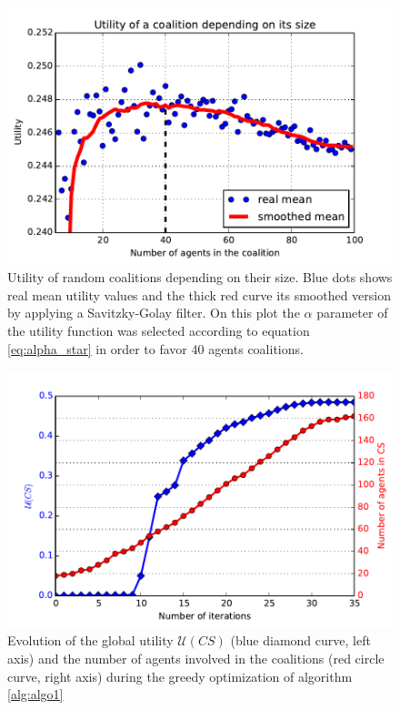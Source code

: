 \documentclass[conference]{IEEEtran}
\begin{document}
\begin{figure}
\includegraphics[scale=.6]{real_utility_2.pdf}
\caption{Utility of random coalitions depending on their size. Blue dots shows real mean utility values and the thick red curve its smoothed version by applying a Savitzky-Golay filter. On this plot the $ \alpha $ parameter of the utility function was selected according to equation \ref{eq:alpha_star} in order to favor 40 agents coalitions.}
\label{fig:real_utility2}
\end{figure}

\begin{figure}
\includegraphics[scale=.6]{search.pdf}
\caption{Evolution of the global utility $ \mathcal{U}(CS) $ (blue diamond curve, left axis) and the number of agents involved in the coalitions (red circle curve, right axis) during the greedy optimization of algorithm \ref{alg:algo1} }
\label{fig:search}
\end{figure}
\end{document}
